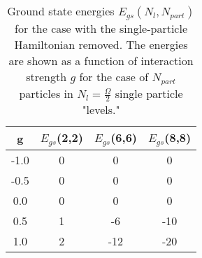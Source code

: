 \documentclass[11pt]{article}
\begin{document}
\begin{table}
\begin{center}
\begin{tabular}{|c|c|c|c|}
\hline
   g   &  $E_{gs}$(2,2)  &  $E_{gs}$(6,6)  & $ E_{gs}$(8,8) \\ \hline
-1.0  &  0  &  0  &  0   \\
-0.5  &  0  &  0  &  0   \\
  0.0  &  0  &  0  &  0   \\
  0.5  &  1  & -6  &  -10 \\
  1.0  &  2  & -12 &  -20 \\
\hline
\end{tabular}
\end{center}
\caption{Ground state energies $E_{gs}(N_l,N_{part})$ for the case with
the single-particle Hamiltonian removed. The energies are shown as a
function of interaction strength $g$ for the case of $N_{part}$
particles in $N_l=\frac{\Omega}{2}$ single particle "levels."}
\label{tab:data-nosinglepart}
\end{table}

\clearpage

\end{document}
